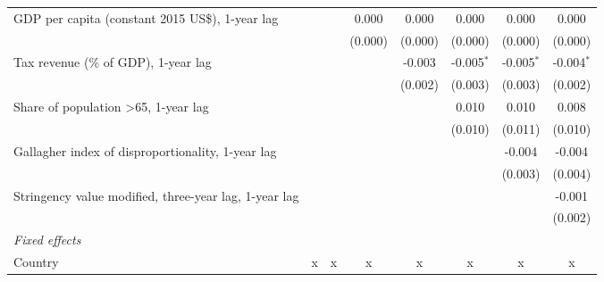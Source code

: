 \begin{tabular}{lccccccc}
   GDP per capita (constant 2015 US\$), 1-year lag                                         &                &               & 0.000         & 0.000         & 0.000        & 0.000        & 0.000\\   
                                                                                           &                &               & (0.000)       & (0.000)       & (0.000)      & (0.000)      & (0.000)\\   
   Tax revenue (\% of GDP), 1-year lag                                                     &                &               &               & -0.003        & -0.005$^{*}$ & -0.005$^{*}$ & -0.004$^{*}$\\   
                                                                                           &                &               &               & (0.002)       & (0.003)      & (0.003)      & (0.002)\\   
   Share of population >65, 1-year lag                                                     &                &               &               &               & 0.010        & 0.010        & 0.008\\   
                                                                                           &                &               &               &               & (0.010)      & (0.011)      & (0.010)\\   
   Gallagher index of disproportionality, 1-year lag                                       &                &               &               &               &              & -0.004       & -0.004\\   
                                                                                           &                &               &               &               &              & (0.003)      & (0.004)\\   
   Stringency value modified, three-year lag, 1-year lag                                   &                &               &               &               &              &              & -0.001\\   
                                                                                           &                &               &               &               &              &              & (0.002)\\   
   \emph{Fixed effects}\\
   Country                                                                                 & x              & x             & x             & x             & x            & x            & x\\  

\end{tabular}
